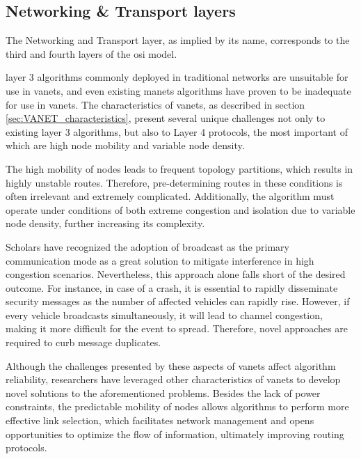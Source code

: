 \subsection[Networking \& Transport layers]{Networking \& Transport layers}
\label{subsec:networking_transport_layers}
The Networking and Transport layer, as implied by its name, corresponds to the third and fourth layers of the \gls{osi} model.

layer 3 algorithms commonly deployed in traditional networks are unsuitable for use in \glspl{vanet}\cite{toor_vehicle_2008}, and even existing \glspl{manet} algorithms have proven to be inadequate for use in \glspl{vanet}\cite{liang_vehicular_2015}. The characteristics of \glspl{vanet}, as described in section \ref{sec:VANET_characteristics}, present several unique challenges not only to existing layer 3 algorithms, but also to Layer 4 protocols, the most important of which are high node mobility and variable node density.

The high mobility of nodes leads to frequent topology partitions, which results in highly unstable routes. Therefore, pre-determining routes in these conditions is often irrelevant and extremely complicated. Additionally, the algorithm must operate under conditions of both extreme congestion and isolation due to variable node density, further increasing its complexity.

Scholars have recognized the adoption of broadcast as the primary communication mode as a great solution to mitigate interference in high congestion scenarios. Nevertheless, this approach alone falls short of the desired outcome. For instance, in case of a crash, it is essential to rapidly disseminate security messages as the number of affected vehicles can rapidly rise. However, if every vehicle broadcasts simultaneously, it will lead to channel congestion, making it more difficult for the event to spread\cite{toor_vehicle_2008}. Therefore, novel approaches are required to curb message duplicates. 

Although the challenges presented by these aspects of \glspl{vanet} affect algorithm reliability, researchers have leveraged other characteristics of \glspl{vanet} to develop novel solutions to the aforementioned problems. Besides the lack of power constraints, the predictable mobility of nodes allows algorithms to perform more effective link selection, which facilitates network management and opens opportunities to optimize the flow of information, ultimately improving routing protocols.

